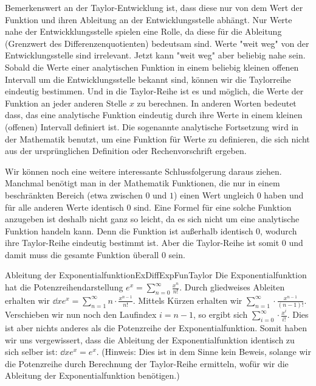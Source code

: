 Bemerkenswert an der Taylor-Entwicklung ist, dass diese nur von dem Wert der Funktion und ihren Ableitung an der Entwicklungsstelle abhängt. Nur Werte nahe der Entwickklungsstelle spielen eine Rolle, da diese für die Ableitung (Grenzwert des Differenzenquotienten) bedeutsam sind. Werte "weit weg" von der Entwicklungsstelle sind irrelevant. Jetzt kann "weit weg" aber beliebig nahe sein. Sobald die Werte einer analytischen Funktion in einem beliebig kleinen offenen Intervall um die Entwicklungsstelle bekannt sind, können wir die Taylorreihe eindeutig bestimmen. Und in die Taylor-Reihe ist es und möglich, die Werte der Funktion an jeder anderen Stelle $x$ zu berechnen. In anderen Worten bedeutet dass, das eine analytische Funktion eindeutig durch ihre Werte in einem kleinen (offenen) Intervall definiert ist. Die sogenannte analytische Fortsetzung wird in der Mathematik benutzt, um eine Funktion für Werte zu definieren, die sich nicht aus der ursprünglichen Definition oder Rechenvorschrift ergeben.

Wir können noch eine weitere interessante Schlussfolgerung daraus ziehen. Manchmal benötigt man in der Mathematik Funktionen, die nur in einem beschränkten Bereich (etwa zwischen $0$ und $1$) einen Wert ungleich $0$ haben und für alle anderen Werte identisch $0$ sind. Eine Formel für eine solche Funktion anzugeben ist deshalb nicht ganz so leicht, da es sich nicht um eine analytische Funktion handeln kann. Denn die Funktion ist außerhalb identisch $0$, wodurch ihre Taylor-Reihe eindeutig bestimmt ist. Aber die Taylor-Reihe ist somit $0$ und damit muss die gesamte Funktion überall $0$ sein.

\begin{example}{Ableitung der Exponentialfunktion}{ExDiffExpFunTaylor}
    Die Exponentialfunktion hat die Potenzreihendarstellung $e^x=\sum\limits_{n=0}^\infty \frac{x^n}{n!}$. Durch gliedweises Ableiten erhalten wir $\dd{}{x} e^x = \sum\limits_{n=1}^\infty n \cdot \frac{x^{n-1}}{n!}$. Mittels Kürzen erhalten wir $\sum\limits_{n=1}^\infty \cdot \frac{x^{n-1}}{(n-1)!}$. Verschieben wir nun noch den Laufindex $i = n-1$, so ergibt sich $\sum\limits_{i=0}^\infty \cdot \frac{x^i}{i!}$. Dies ist aber nichts anderes als die Potenzreihe der Exponentialfunktion. Somit haben wir uns vergewissert, dass die Ableitung der Exponentialfunktion identisch zu sich selber ist: $\dd{}{x}e^x = e^x$. (Hinweis: Dies ist in dem Sinne kein Beweis, solange wir die Potenzreihe durch Berechnung der Taylor-Reihe ermitteln, wofür wir die Ableitung der Exponentialfunktion benötigen.)
\end{example}

